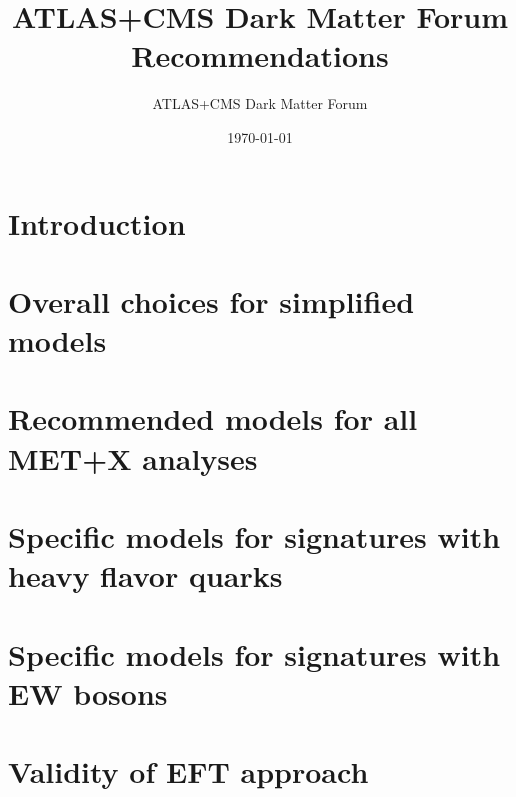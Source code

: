 \documentclass[a4paper,debug,notitlepage,nobib]{tufte-book}
\title{ATLAS+CMS Dark Matter Forum Recommendations}
\author{ATLAS+CMS Dark Matter Forum}
\date{\today}
\begin{document}
\morefloats
\setcounter{secnumdepth}{3} %



\tableofcontents

\pagebreak

\chapter{Introduction}
\label{sec:Introduction}


\chapter{Overall choices for simplified models}
\label{sec:SimplifiedModelsIntro} 


\chapter{Recommended models for all MET+X analyses}
\label{subsec:MonojetLikeModels}


% 


\chapter{Specific models for signatures with heavy flavor quarks}
\label{subsec:DMHFModels}


\chapter{Specific models for signatures with EW bosons}
\label{subsec:EWSpecificModels}



%
\chapter{Validity of EFT approach}
\label{sec:EFTValidity} 

%
%
\appendix
\end{document}
